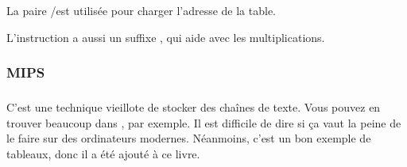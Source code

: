 La paire \ADRP/\ADD est utilisée pour charger l'adresse de la table.

L'instruction \ADD a aussi un suffixe \LSL, qui aide avec les multiplications.

\subsubsection{MIPS}


\subsubsection{\Conclusion{}}

C'est une technique vieillote de stocker des chaînes de texte.
Vous pouvez en trouver beaucoup dans \oracle, par exemple.
Il est difficile de dire si ça vaut la peine de le faire sur des ordinateurs modernes.
Néanmoins, c'est un bon exemple de tableaux, donc il a été ajouté à ce livre.

